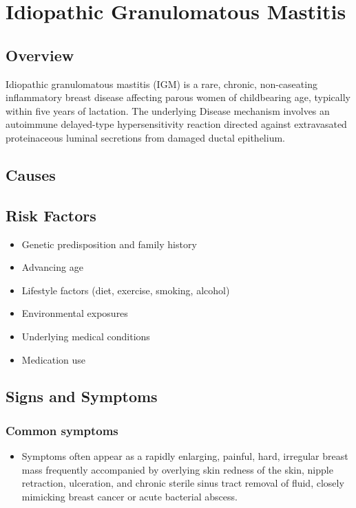 \chapter{Idiopathic Granulomatous Mastitis}
\label{sec:Idiopathic Granulomatous Mastitis}

\section{Overview}
Idiopathic granulomatous mastitis (IGM) is a rare, chronic, non-caseating inflammatory breast disease affecting parous women of childbearing age, typically within five years of lactation. The underlying Disease mechanism involves an autoimmune delayed-type hypersensitivity reaction directed against extravasated proteinaceous luminal secretions from damaged ductal epithelium.
\section{Causes}
\section{Risk Factors}

\begin{itemize}[noitemsep]
  \item Genetic predisposition and family history
  \item Advancing age
  \item Lifestyle factors (diet, exercise, smoking, alcohol)
  \item Environmental exposures
  \item Underlying medical conditions
  \item Medication use
\end{itemize}
\section{Signs and Symptoms}

\subsection{Common symptoms}
\begin{itemize}[noitemsep]
  \item Symptoms often appear as a rapidly enlarging, painful, hard, irregular breast mass frequently accompanied by overlying skin redness of the skin, nipple retraction, ulceration, and chronic sterile sinus tract removal of fluid, closely mimicking breast cancer or acute bacterial abscess. 
  \end{itemize}

